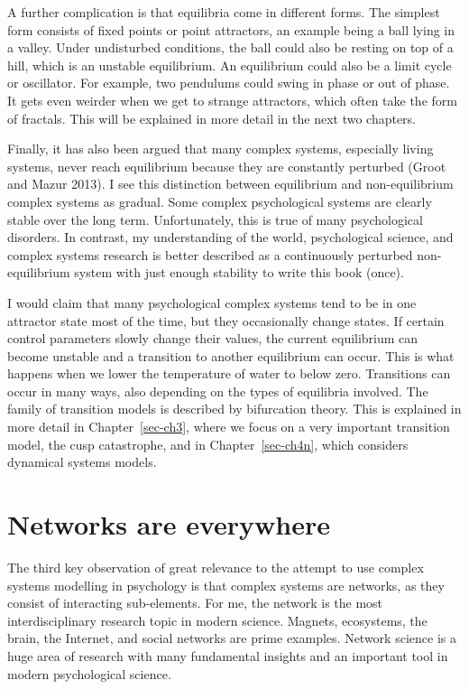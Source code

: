 \documentclass[
  a4paper,
  DIV=11,
  numbers=noendperiod]{scrreprt}
\begin{document}
A further complication is that equilibria come in different forms. The
simplest form consists of fixed points or point attractors, an example
being a ball lying in a valley. Under undisturbed conditions, the ball
could also be resting on top of a hill, which is an unstable
equilibrium. An equilibrium could also be a limit cycle or oscillator.
For example, two pendulums could swing in phase or out of phase. It gets
even weirder when we get to strange attractors, which often take the
form of fractals. This will be explained in more detail in the next two
chapters.

Finally, it has also been argued that many complex systems, especially
living systems, never reach equilibrium because they are constantly
perturbed (Groot and Mazur 2013). I see this distinction between
equilibrium and non-equilibrium complex systems as gradual. Some complex
psychological systems are clearly stable over the long term.
Unfortunately, this is true of many psychological disorders. In
contrast, my understanding of the world, psychological science, and
complex systems research is better described as a continuously perturbed
non-equilibrium system with just enough stability to write this book
(once).

I would claim that many psychological complex systems tend to be in one
attractor state most of the time, but they occasionally change states.
If certain control parameters slowly change their values, the current
equilibrium can become unstable and a transition to another equilibrium
can occur. This is what happens when we lower the temperature of water
to below zero. Transitions can occur in many ways, also depending on the
types of equilibria involved. The family of transition models is
described by bifurcation theory. This is explained in more detail in
Chapter~\ref{sec-ch3}, where we focus on a very important transition
model, the cusp catastrophe, and in Chapter~\ref{sec-ch4n}, which
considers dynamical systems models.

\hypertarget{sec-Networks-are-everywhere}{%
\section{Networks are everywhere}\label{sec-Networks-are-everywhere}}

The third key observation of great relevance to the attempt to use
complex systems modelling in psychology is that complex systems are
networks, as they consist of interacting sub-elements. For me, the
network is the most interdisciplinary research topic in modern science.
Magnets, ecosystems, the brain, the Internet, and social networks are
prime examples. Network science is a huge area of research with many
fundamental insights and an important tool in modern psychological
science.
\end{document}
